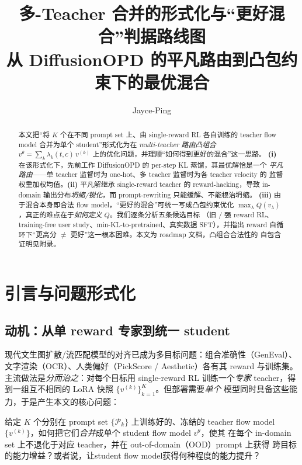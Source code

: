 \documentclass[11pt,a4paper]{article}
\title{\textbf{多-Teacher 合并的形式化与``更好混合''判据路线图}\\[0.3em]
\large 从 DiffusionOPD 的平凡路由到凸包约束下的最优混合}
\author{Jayce-Ping}
\date{}
\newcommand{\stu}{\theta}
\theoremstyle{definition}
\begin{document}
\maketitle

\begin{abstract}
本文把``将 $K$ 个在不同 prompt set 上、由 single-reward RL 各自训练的 teacher flow model
合并为单个 student''形式化为在 \emph{multi-teacher 路由凸组合}
$v^\stu=\sum_k\lambda_k(t,c)\,v^{(k)}$ 上的优化问题，并理顺``如何得到更好的混合''这一思路。
\textbf{(i)} 在该形式化下，先前工作 DiffusionOPD 的 per-step KL 蒸馏，其最优解恰是一个
\emph{平凡路由}——单 teacher 监督时为 one-hot、多 teacher 监督时为各 teacher velocity 的
监督权重加权均值。\textbf{(ii)} 平凡解继承 single-reward teacher 的
reward-hacking，导致 in-domain 输出分布\emph{坍缩/锐化}，而 prompt-rewriting 只能缓解、不能根治坍缩。
\textbf{(iii)} 由于混合本身即合法 flow model，``更好的混合''可统一写成凸包约束优化
$\max_\lambda Q(v_\lambda)$，真正的难点在于\emph{如何定义} $Q$。我们逐条分析五条候选目标
（旧 / 强 reward RL、training-free user study、min-KL-to-pretrained、真实数据 SFT），并指出
reward 自循环下``更高分 $\neq$ 更好''这一根本困难。本文为 roadmap 文档，凸组合合法性的
自包含证明见附录。
\end{abstract}

\tableofcontents
\newpage

\section{引言与问题形式化}
\label{sec:intro}

\subsection{动机：从单 reward 专家到统一 student}

现代文生图扩散/流匹配模型的对齐已成为多目标问题：组合准确性（GenEval）、
文字渲染（OCR）、人类偏好（PickScore / Aesthetic）各有其 reward 与训练集。
主流做法是\emph{分而治之}：对每个目标用 single-reward RL 训练一个\emph{专家}
teacher，得到一组互不相同的 LoRA 快照 $\{v^{(k)}\}_{k=1}^K$。但部署需要\emph{单个}
模型同时具备这些能力，于是产生本文的核心问题：

\begin{tcolorbox}[colback=blue!5,colframe=blue!50!black,title=\textbf{核心问题}]
给定 $K$ 个分别在 prompt set $\{\mathcal{P}_k\}$ 上训练好的、冻结的 teacher flow
model $\{v^{(k)}\}$，如何把它们\emph{合并}成单个 student flow model $v^\stu$，使其
在每个 in-domain set 上不退化于对应 teacher，并在 out-of-domain（OOD）prompt 上获得
跨目标的能力增益？或者说，让student flow model获得何种程度的能力提升？
\end{tcolorbox}
\end{document}

